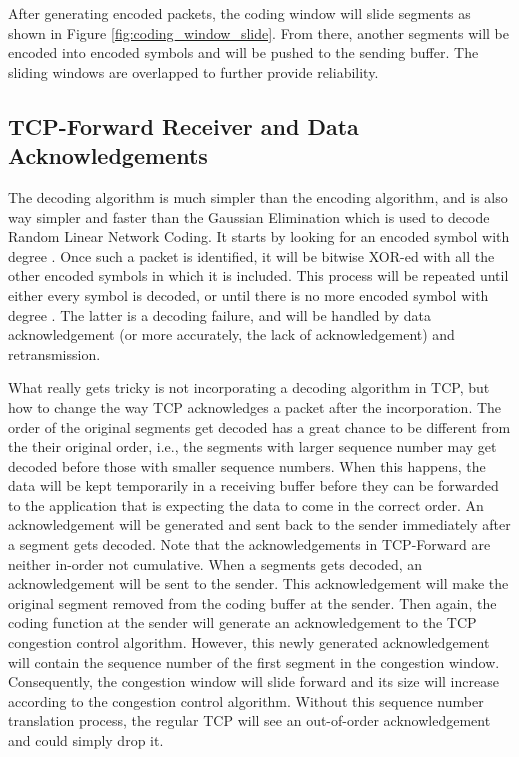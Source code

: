 \documentclass[10pt, conference, final, letterpaper]{IEEEtran}
\theoremstyle{definition}
\begin{document}
After generating  encoded packets, the coding window will slide  segments as shown in Figure \ref{fig:coding_window_slide}. From there, another  segments will be encoded into  encoded symbols and will be pushed to the sending buffer. The sliding windows are overlapped to further provide reliability.

\subsection{TCP-Forward Receiver and Data Acknowledgements}
\label{section:TCP-Forward:receiver}

The decoding algorithm is much simpler than the encoding algorithm, and is also way simpler and faster than the Gaussian Elimination which is used to decode Random Linear Network Coding. It starts by looking for an encoded symbol with degree . Once such a packet is identified, it will be bitwise XOR-ed with all the other encoded symbols in which it is included. This process will be repeated until either every symbol is decoded, or until there is no more encoded symbol with degree . The latter is a decoding failure, and will be handled by data acknowledgement (or more accurately, the lack of acknowledgement) and retransmission. 

What really gets tricky is not incorporating a decoding algorithm in TCP, but how to change the way TCP acknowledges a packet after the incorporation. The order of the original segments get decoded has a great chance to be different from the their original order, i.e., the segments with larger sequence number may get decoded before those with smaller sequence numbers. When this happens, the data will be kept temporarily in a receiving buffer before they can be forwarded to the application that is expecting the data to come in the correct order. An acknowledgement will be generated and sent back to the sender immediately after a segment gets decoded. Note that the acknowledgements in TCP-Forward are neither in-order not cumulative. When a segments gets decoded, an acknowledgement will be sent to the sender. This acknowledgement will make the original segment removed from the coding buffer at the sender. Then again, the coding function at the sender will generate an acknowledgement to the TCP congestion control algorithm. However, this newly generated acknowledgement will contain the sequence number of the first segment in the congestion window. Consequently, the congestion window will slide forward and its size will increase according to the congestion control algorithm. Without this sequence number translation process, the regular TCP will see an out-of-order acknowledgement and could simply drop it.
\end{document}
